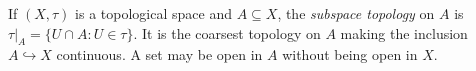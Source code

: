 
If $(X,\tau)$ is a topological space and $A\subseteq X$, the \emph{subspace topology} on $A$ is $\tau|_A=\{U\cap A:U\in\tau\}$. It is the coarsest topology on $A$ making the inclusion $A\hookrightarrow X$ continuous. A set may be open in $A$ without being open in $X$.
